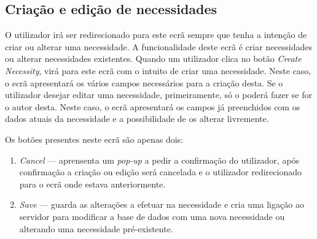 \subsection{Criação e edição de necessidades}\label{sec:necessityCreation}

O utilizador irá ser redirecionado para este ecrã sempre que tenha a intenção de criar ou alterar uma necessidade.
A funcionalidade deste ecrã é criar necessidades ou alterar necessidades existentes.
Quando um utilizador clica no botão \textit{Create Necessity}, virá para este ecrã com o intuito de criar uma necessidade.
Neste caso, o ecrã apresentará os vários campos necessários para a criação desta.
Se o utilizador desejar editar uma necessidade, primeiramente, só o poderá fazer se for o autor desta.
Neste caso, o ecrã apresentará os campos já preenchidos com os dados atuais da necessidade e a possibilidade de os alterar livremente.

Os botões presentes neste ecrã são apenas dois:
\begin{enumerate}
    \item \textit{Cancel} --- aprensenta um \textit{pop-up} a pedir a confirmação do utilizador, após confirmação a criação ou edição será cancelada e o utilizador redirecionado para o ecrã onde estava anteriormente.
    \item \textit{Save} --- guarda as alterações a efetuar na necessidade e cria uma ligação ao servidor para modificar a base de dados com uma nova necessidade ou alterando uma necessidade pré-existente.
\end{enumerate}